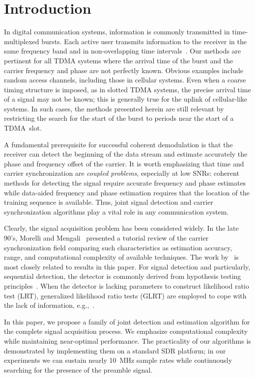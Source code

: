 \section{Introduction}%
\label{sec:introduction}

In digital communication systems, information is commonly transmitted in time-multiplexed bursts.
Each active user transmits information to the receiver
in the same frequency band and in non-overlapping time intervals~\cite{Falconer_95}. 
Our methods are pertinent for all TDMA systems where the arrival time
of the burst and the carrier frequency and phase are
not perfectly known.
Obvious examples include random access channels, including those in cellular
systems. Even when a coarse timing structure is imposed, as in slotted
TDMA systems, the precise arrival time of a signal may not be known;
this is generally true for the uplink of cellular-like systems. 
In such cases, the methods presented herein are still relevant  by
restricting the search for the start of the burst to periods near the
start of a TDMA~slot. 

A fundamental prerequisite for successful coherent demodulation is that the receiver can
detect the beginning of the data stream and estimate accurately the phase and frequency offset of the carrier.
It is worth emphasizing that time and carrier synchronization are \emph{coupled problems}, especially at low SNRs:
coherent methods for detecting the signal require accurate frequency and phase estimates 
while data-aided frequency and phase estimation requires that the location of the training sequence is available.
Thus, joint signal detection and carrier synchronization algorithms play a vital role in any communication system.

Clearly, the signal acquisition problem has been considered widely. 
In the late 90's, Morelli and Mengali~\cite{Morelli_Mengali_98} presented a tutorial review
of the carrier synchronization field comparing such characteristics as estimation accuracy, range,
and computational complexity of available techniques.
The work by~\cite{kay_89,Fitz_94,Luise_Reggiannini_95}
is most closely related to results in this paper.
For signal detection and
particularly, sequential detection, the detector
is commonly derived from hypothesis testing principles~\cite{Ramakrishnan_10,Chiani_06,Liang_15}.
When the detector is lacking parameters to construct 
likelihood ratio test (LRT), generalized likelihood ratio tests (GLRT)
are employed to cope with the lack of information, e.g.,~\cite{Chiani_06}. 

In this paper, we propose a family of joint detection and estimation algorithm 
for the complete signal acquisition process.
We emphasize computational complexity while maintaining near-optimal performance.
The practicality of our algorithms is demonstrated by implementing
them on a standard SDR platform; in our experiments we can sustain
nearly \SI{10}{\mega\hertz} sample rates while continuously searching
for the presence of the preamble signal.
